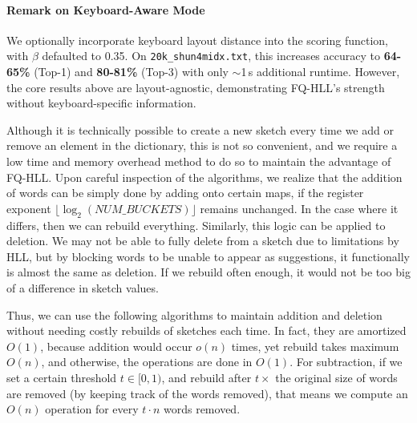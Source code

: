 \documentclass[12pt,a4paper]{article}
\begin{document}
\paragraph{Remark on Keyboard-Aware Mode}
We optionally incorporate keyboard layout distance into the scoring function, with $\beta$ defaulted to 0.35. On \texttt{20k\_shun4midx.txt}, this increases accuracy to \textbf{64-65\%} (Top-1) and \textbf{80-81\%} (Top-3) with only $\sim$1\,s additional runtime. However, the core results above are layout-agnostic, demonstrating FQ-HLL's strength without keyboard-specific information. \newline

Although it is technically possible to create a new sketch every time we add or remove an element in the dictionary, this is not so convenient, and we require a low time and memory overhead method to do so to maintain the advantage of FQ-HLL. Upon careful inspection of the algorithms, we realize that the addition of words can be simply done by adding onto certain maps, if the register exponent $\lfloor \log_2 (NUM\_BUCKETS) \rfloor$ remains unchanged. In the case where it differs, then we can rebuild everything. Similarly, this logic can be applied to deletion. We may not be able to fully delete from a sketch due to limitations by HLL, but by blocking words to be unable to appear as suggestions, it functionally is almost the same as deletion. If we rebuild often enough, it would not be too big of a difference in sketch values. \newline

Thus, we can use the following algorithms to maintain addition and deletion without needing costly rebuilds of sketches each time. In fact, they are amortized $O(1)$, because addition would occur $o(n)$ times, yet rebuild takes maximum $O(n)$, and otherwise, the operations are done in $O(1)$. For subtraction, if we set a certain threshold $t \in [0, 1)$, and rebuild after $t\times$ the original size of words are removed (by keeping track of the words removed), that means we compute an $O(n)$ operation for every $t \cdot n$ words removed. \newline
\end{document}
